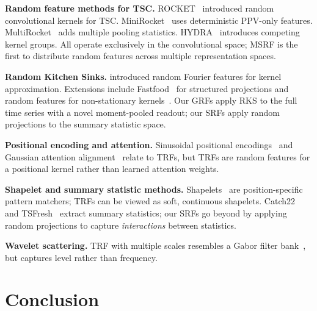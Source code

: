 \documentclass{article}
\begin{document}
\textbf{Random feature methods for TSC.}
ROCKET~\citep{dempster2020rocket} introduced random convolutional kernels for TSC.
MiniRocket~\citep{dempster2021minirocket} uses deterministic PPV-only features.
MultiRocket~\citep{tan2022multirocket} adds multiple pooling statistics.
HYDRA~\citep{dempster2023hydra} introduces competing kernel groups.
All operate exclusively in the convolutional space; MSRF is the first to distribute random features across multiple representation spaces.

\textbf{Random Kitchen Sinks.}
\citet{rahimi2007random,rahimi2008weighted} introduced random Fourier features for kernel approximation.
Extensions include Fastfood~\citep{le2013fastfood} for structured projections and random features for non-stationary kernels~\citep{ton2018spatial}.
Our GRFs apply RKS to the full time series with a novel moment-pooled readout; our SRFs apply random projections to the summary statistic space.

\textbf{Positional encoding and attention.}
Sinusoidal positional encodings~\citep{vaswani2017attention} and Gaussian attention alignment~\citep{luong2015effective,graves2013generating} relate to TRFs, but TRFs are random features for a positional kernel rather than learned attention weights.

\textbf{Shapelet and summary statistic methods.}
Shapelets~\citep{ye2009shapelets} are position-specific pattern matchers; TRFs can be viewed as soft, continuous shapelets.
Catch22~\citep{lubba2019catch22} and TSFresh~\citep{christ2018tsfresh} extract summary statistics; our SRFs go beyond by applying random projections to capture \emph{interactions} between statistics.

\textbf{Wavelet scattering.}
TRF with multiple scales resembles a Gabor filter bank~\citep{mallat2012group}, but captures level rather than frequency.


\section{Conclusion}
\label{sec:conclusion}
\end{document}
